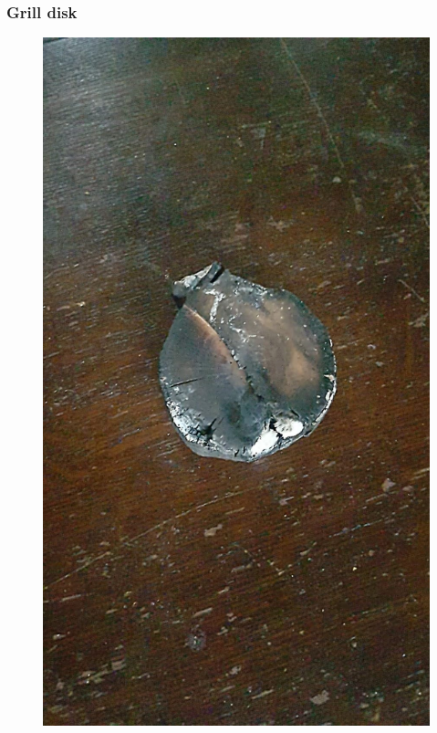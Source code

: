 \documentclass{beamer}
\begin{document}
\begin{frame}
\frametitle{Grill disk}
\begin{figure}
\includegraphics[height=.7\textheight]{images/bbq-disk.jpeg}
\end{figure}
\end{frame}
\end{document}
